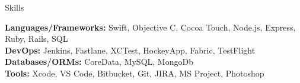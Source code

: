 \documentclass{resume} %
\begin{document}

\begin{rSection}{Skills}

\textbf{Languages/Frameworks:} Swift, Objective C, Cocoa Touch, Node.js, Express, Ruby, Rails, SQL  \\
\textbf{DevOps:} Jenkins, Fastlane, XCTest, HockeyApp, Fabric, TestFlight \\
\textbf{Databases/ORMs:} CoreData, MySQL, MongoDb  \\
\textbf{Tools:} Xcode, VS Code, Bitbucket, Git, JIRA, MS Project, Photoshop  \\

\end{rSection}
\end{document}
